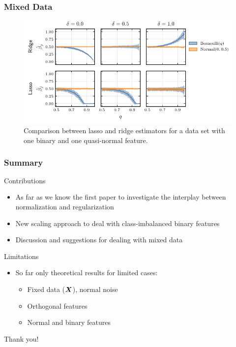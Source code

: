 \documentclass[10pt]{beamer}
\begin{document}
\begin{frame}[c]
  \frametitle{Mixed Data}

  \begin{figure}[htpb]
    \centering
    \includegraphics[width=\textwidth]{images/paper6-mixed_data.pdf}
    \caption{%
      Comparison between lasso and ridge estimators for a data set with one binary and one quasi-normal feature.}
  \end{figure}
\end{frame}

\begin{frame}[c]
  \frametitle{Summary}
  \begin{exampleblock}{Contributions}
    \begin{itemize}
      \item As far as we know the first paper to investigate the interplay between normalization and
            regularization
      \item New scaling approach to deal with class-imbalanced binary features
      \item Discussion and suggestions for dealing with mixed data
    \end{itemize}
  \end{exampleblock}

  \pause

  \begin{alertblock}{Limitations}
    \begin{itemize}
      \item So far only theoretical results for limited cases:
            \begin{itemize}
              \item Fixed data (\(\bm{X}\)), normal noise
              \item Orthogonal features
              \item Normal and binary features
            \end{itemize}
    \end{itemize}
  \end{alertblock}
\end{frame}

\begin{frame}[standout]
  Thank you!
\end{frame}


% 
\end{document}
